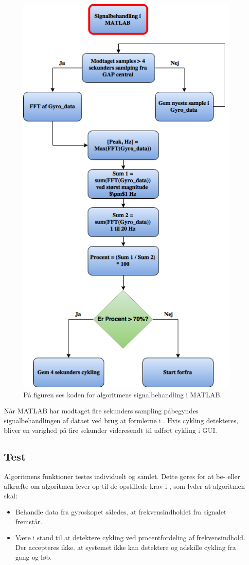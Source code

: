 \begin{figure}[H]
	\centering
	\includegraphics[scale=0.4]{figures/cDesign/algoritme_matlab_cykling.png}
	\caption{På figuren ses koden for algoritmens signalbehandling i MATLAB.}
	\label{fig:matlab_cykling}
\end{figure} 
Når MATLAB har modtaget fire sekunders sampling påbegyndes signalbehandlingen af dataet ved brug at formlerne i . Hvis cykling detekteres, bliver en varighed på fire sekunder videresendt til udført cykling i GUI. 

\subsection{Test}
Algoritmens funktioner testes individuelt og samlet. Dette gøres for at be- eller afkræfte om algoritmen lever op til de opstillede krav i , som lyder at algoritmen skal:
\begin{itemize}
	\item Behandle data fra gyroskopet således, at frekvensindholdet fra signalet fremstår.
	\item Være i stand til at detektere cykling ved procentfordeling af frekvensindhold. Der accepteres ikke, at systemet ikke kan detektere og adskille cykling fra gang og løb.
\end{itemize}

